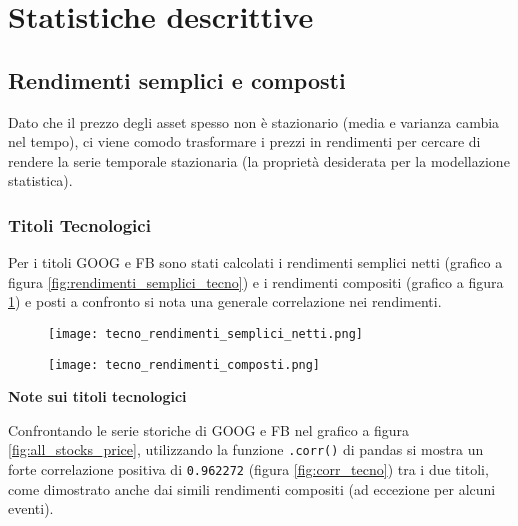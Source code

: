 
\section{Statistiche descrittive}

\subsection{Rendimenti semplici e composti}

Dato che il prezzo degli asset spesso non è stazionario (media e varianza cambia nel tempo), ci viene comodo trasformare i prezzi in rendimenti per cercare
di rendere la serie temporale stazionaria (la proprietà desiderata per la modellazione statistica).



\subsubsection{Titoli Tecnologici}

Per i titoli GOOG e FB sono stati calcolati i rendimenti semplici netti (grafico a figura \ref{fig:rendimenti_semplici_tecno}) e i rendimenti compositi (grafico a figura \ref{fig:rendimenti_compositi_tecno}) e posti a confronto
si nota una generale correlazione nei rendimenti.

\begin{figure}[h]
    \centering
    \begin{minipage}{.5\textwidth}
      \centering
      \texttt{[image: tecno\_rendimenti\_semplici\_netti.png]}
      \label{fig:rendimenti_semplici_tecno}
    \end{minipage}%
    \begin{minipage}{.5\textwidth}
      \centering
      \texttt{[image: tecno\_rendimenti\_composti.png]}
      \label{fig:rendimenti_compositi_tecno}
    \end{minipage}
\end{figure}

\textbf{Note sui titoli tecnologici}

Confrontando le serie storiche di GOOG e FB nel grafico a figura \ref{fig:all_stocks_price}, utilizzando la funzione \verb|.corr()| di pandas si mostra un forte correlazione positiva di \verb|0.962272| (figura \ref{fig:corr_tecno})
tra i due titoli, come dimostrato anche dai simili rendimenti compositi (ad eccezione per alcuni eventi).

